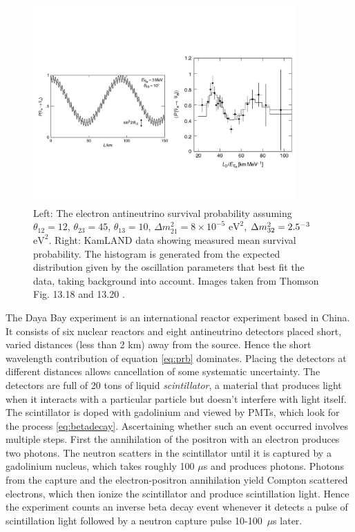 \begin{figure}
  \centering
  \vspace{-20mm}
  \includegraphics[width=0.9\textwidth,keepaspectratio]
                {pictures/t13_18&20.pdf}
  \vspace*{-15mm}
  \caption{Left: The electron antineutrino survival probability assuming
           $\theta_{12}=12$\textdegree, $\theta_{23}=45$\textdegree,
           $\theta_{13}=10$\textdegree, $\Delta m_{21}^2=8\times10^{-5}$
           $\text{eV}^2$, $\Delta m_{32}^2=2.5\time10^{-3}$ $\text{eV}^2$.
           Right: KamLAND data showing measured mean survival probability.
           The histogram is generated from the expected distribution given
           by the oscillation parameters that best fit the data, taking
           background into account. Images taken from Thomson Fig.
           13.18 and 13.20 \cite{thomson_modern_2013}.}
  \label{fig:kamland}
\end{figure}

The Daya Bay experiment is an international reactor experiment based in China.
It consists of
six nuclear reactors and eight antineutrino detectors placed short, varied
distances (less than 2 km) away from the source. Hence the short
wavelength contribution of equation \eqref{eq:prb} dominates. Placing the
detectors at different distances allows cancellation of some systematic
uncertainty. The detectors are full of 20 tons of
liquid {\it scintillator}, a material that produces light when it interacts
with a particular particle but doesn't interfere with light itself.
The scintillator is doped with gadolinium and viewed by PMTs, which look for
the process \eqref{eq:betadecay}. Ascertaining whether such an event occurred
involves multiple steps. First the annihilation of the positron with an
electron produces two photons. The neutron scatters in the scintillator until
it is captured by a gadolinium nucleus, which takes roughly 100 $\mu$s and
produces photons. Photons from
the capture and the electron-positron annihilation yield Compton scattered
electrons, which then ionize the scintillator and produce scintillation light.
Hence the experiment counts an inverse beta decay event whenever it detects
a pulse of scintillation light followed by a neutron capture pulse
10-100~$\mu$s later.

